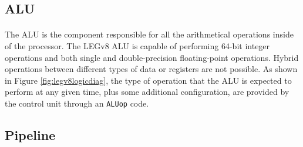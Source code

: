\subsection{ALU}
\paragraph{}
The ALU is the component responsible for all the arithmetical operations inside of the processor. The LEGv8 ALU is capable of performing 64-bit integer operations and both single and double-precision floating-point operations. Hybrid operations between different types of data or registers are not possible. As shown in Figure \ref{fig:legv8logicdiag}, the type of operation that the ALU is expected to perform at any given time, plus some additional configuration, are provided by the control unit through an \verb|ALUop| code.
\subsection{Pipeline}
